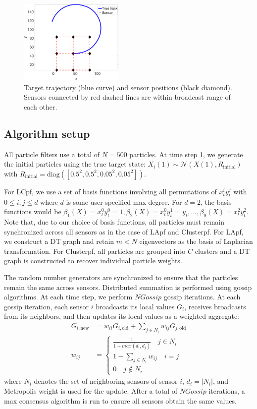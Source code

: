 \documentclass[10pt,letterpaper,final]{article}
\begin{document}
\begin{figure}
\centering
\includegraphics[width=0.45\textwidth]{Figures/track}
\caption{Target trajectory (blue curve) and sensor positions (black diamond). Sensors connected by red dashed lines are within broadcast range of each other.}
\label{fig:track}
\end{figure}

\subsection{Algorithm setup}
All particle filters use a total of $N=500$ particles. At time step 1, we generate the initial particles using the true target state: $X_i(1) \sim \mathcal{N}(X(1), R_{\text{initial}})$ with $R_{\text{initial}}=\text{diag}([0.5^2,0.5^2,0.05^2,0.05^2])$. 

For LCpf, we use a set of basis functions involving all permutations of $x_t^iy_t^j$ with $0\leq i, j \leq d$ where $d$ is some user-specified max degree. For $d=2$, the basis functions would be $\beta_1(X) = x_t^0 y_t^0 = 1, \beta_2(X) = x_t^0 y_t^1 = y_t, ..., \beta_9(X) = x_t^2 y_t^2 $. Note that, due to our choice of basis functions, all particles must remain synchronized across all sensors as in the case of LApf and Clusterpf. For LApf, we construct a DT graph and retain $m< N$ eigenvectors as the basis of Laplacian transformation. For Clusterpf, all particles are grouped into $C$ clusters and a DT graph is constructed to recover individual particle weights. 

The random number generators are synchronized to ensure that the particles remain the same across sensors. Distributed summation is performed using gossip algorithms. At each time step, we perform $NGossip$ gossip iterations. At each gossip iteration, each sensor $i$ broadcasts its local values $G_i$, receives broadcasts from its neighbors, and then updates its local values as a weighted aggregate:
\begin{align}
G_{i,\text{new}} &= w_{ii}G_{i,\text{old}} + \sum_{j\in N_i}w_{ij}G_{j,\text{old}} \\
w_{ij} &=
\begin{cases}
\frac{1}{1+max(d_i, d_j)} \quad j\in N_i \\
1-\sum_{j\in N_i}w_{ij} \quad i=j \\
0 \quad j\notin N_i
\end{cases}
\label{eqn:metropolis_weight}
\end{align}
where $N_i$ denotes the set of neighboring sensors of sensor $i$, $d_i=|N_i|$, and Metropolis weight is used for the update. After a total of $NGossip$ iterations, a max consensus algorithm is run to ensure all sensors obtain the same values. 
\end{document}
